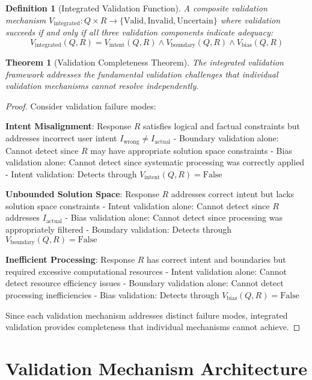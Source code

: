 \documentclass[12pt,a4paper]{article}
\newtheorem{theorem}{Theorem}
\newtheorem{definition}{Definition}
\begin{document}
\begin{definition}[Integrated Validation Function]
A composite validation mechanism $V_{\text{integrated}}: Q \times R \to \{\text{Valid}, \text{Invalid}, \text{Uncertain}\}$ where validation succeeds if and only if all three validation components indicate adequacy:
$$V_{\text{integrated}}(Q, R) = V_{\text{intent}}(Q, R) \land V_{\text{boundary}}(Q, R) \land V_{\text{bias}}(Q, R)$$
\end{definition}

\begin{theorem}[Validation Completeness Theorem]
The integrated validation framework addresses the fundamental validation challenges that individual validation mechanisms cannot resolve independently.
\end{theorem}

\begin{proof}
Consider validation failure modes:

\textbf{Intent Misalignment}: Response $R$ satisfies logical and factual constraints but addresses incorrect user intent $I_{\text{wrong}} \neq I_{\text{actual}}$
- Boundary validation alone: Cannot detect since $R$ may have appropriate solution space constraints
- Bias validation alone: Cannot detect since systematic processing was correctly applied
- Intent validation: Detects through $V_{\text{intent}}(Q, R) = \text{False}$

\textbf{Unbounded Solution Space}: Response $R$ addresses correct intent but lacks solution space constraints
- Intent validation alone: Cannot detect since $R$ addresses $I_{\text{actual}}$  
- Bias validation alone: Cannot detect since processing was appropriately filtered
- Boundary validation: Detects through $V_{\text{boundary}}(Q, R) = \text{False}$

\textbf{Inefficient Processing}: Response $R$ has correct intent and boundaries but required excessive computational resources
- Intent validation alone: Cannot detect resource efficiency issues
- Boundary validation alone: Cannot detect processing inefficiencies  
- Bias validation: Detects through $V_{\text{bias}}(Q, R) = \text{False}$

Since each validation mechanism addresses distinct failure modes, integrated validation provides completeness that individual mechanisms cannot achieve.
\end{proof}

\section{Validation Mechanism Architecture}
\end{document}
